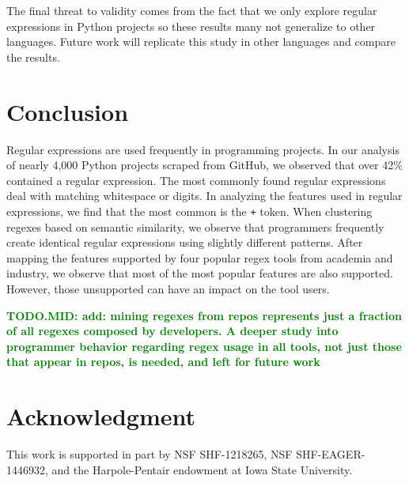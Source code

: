 \documentclass{sig-alternate}
\newcommand{\todoMid}[1]{\textbf{\textcolor{green}{TODO.MID: #1}}} %
\begin{document}
The final threat to validity comes from the fact that we only explore regular expressions in Python projects so these results many not generalize to other languages. Future work will replicate this study in other languages and compare the results.


\section{Conclusion}
\label{sec:conclusion}
Regular expressions are used frequently in programming projects. In our analysis of nearly 4,000 Python projects scraped from GitHub, we observed that over 42\% contained a regular expression. The most commonly found regular expressions deal with matching whitespace or digits.
In analyzing the features used in regular expressions, we find that the most common is the {\tt +} token.
When clustering regexes based on semantic similarity, we observe that programmers frequently create identical regular expressions using slightly different patterns. After mapping the features supported by four popular regex tools from academia and industry, we observe that most of the most popular features are also supported. However, those  unsupported can have an impact on the tool users.

\todoMid{add: mining regexes from repos represents just a fraction of all regexes composed by developers. A deeper study into programmer behavior regarding regex usage in all tools, not just those that appear in repos, is needed, and left for future work}

\section*{Acknowledgment}
This work is supported in part by NSF SHF-1218265, NSF SHF-EAGER-1446932, and the Harpole-Pentair endowment at Iowa State University.




\balance




\end{document}
